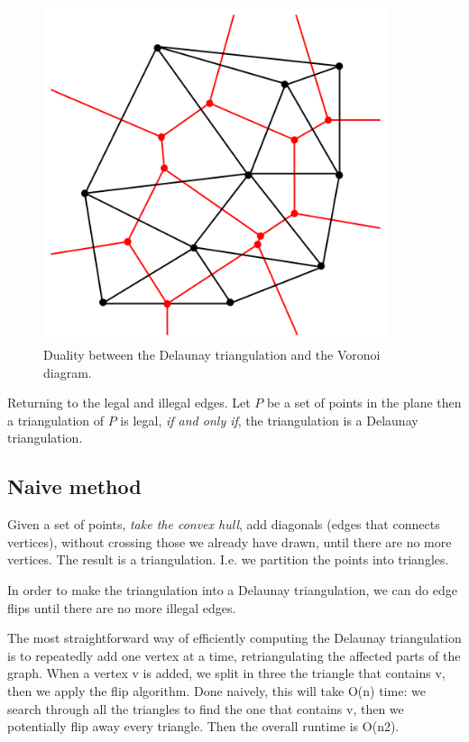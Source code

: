 \documentclass[10pt]{article}
\begin{document}
\begin{figure}[ht]
\centering
\includegraphics[width=0.9\textwidth]{figures/fig8.png}
\caption{Duality between the Delaunay triangulation and the Voronoi diagram.}
\label{fig8}
\end{figure}

Returning to the legal and illegal edges. Let $P$ be a set of points in the plane then a triangulation of $P$ is legal, \emph{if and only if}, the triangulation is a Delaunay triangulation.


\subsection{Naive method} %
\label{sub:naive_method}
Given a set of points, \emph{take the convex hull}, add diagonals (edges that connects vertices), without crossing those we already have drawn, until there are no more vertices. The result is a triangulation. I.e. we partition the points into triangles.

In order to make the triangulation into a Delaunay triangulation, we can do edge flips until there are no more illegal edges.


The most straightforward way of efficiently computing the Delaunay triangulation is to repeatedly add one vertex at a time, retriangulating the affected parts of the graph. When a vertex v is added, we split in three the triangle that contains v, then we apply the flip algorithm. Done naively, this will take O(n) time: we search through all the triangles to find the one that contains v, then we potentially flip away every triangle. Then the overall runtime is O(n2).
\end{document}
